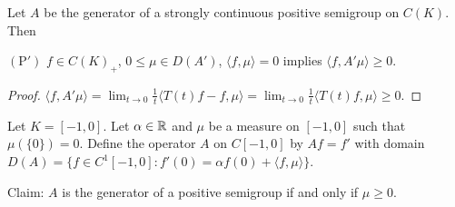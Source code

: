\begin{lemma}\label{lem:b2-1.21}
Let $A$ be the generator of a strongly continuous positive semigroup on $C(K)$.
Then 

$(\mathrm{P}')$ \quad $f \in C(K)_{+}$,  $0 \leq \mu \in D(A')$,  $\langle f,\mu \rangle = 0$ implies  $\langle f,A'\mu \rangle \geq 0$.
\end{lemma}
\begin{proof}
$\langle f,A'\mu \rangle = \lim_{t \to 0} \frac{1}{t} \langle T(t)f - f, \mu \rangle = \lim_{t \to 0} \frac{1}{t} \langle T(t)f, \mu \rangle \geq 0$.
\end{proof}
\begin{example}\label{ex:b2-1.22}
Let $K = [-1,0]$.
Let $\alpha \in \mathbb{R}$ and $\mu$ be a measure on $[-1,0]$ such that $\mu(\{0\}) = 0$.
Define the operator $A$ on $C[-1,0]$ by $Af = f'$ with domain $D(A) = \{f \in C^{1}[-1,0] \colon f'(0) = \alpha f(0) + \langle f,\mu \rangle\}$.

Claim: $A$ is the generator of a positive semigroup if and only if\/ $\mu \geq 0$.
\end{example}
